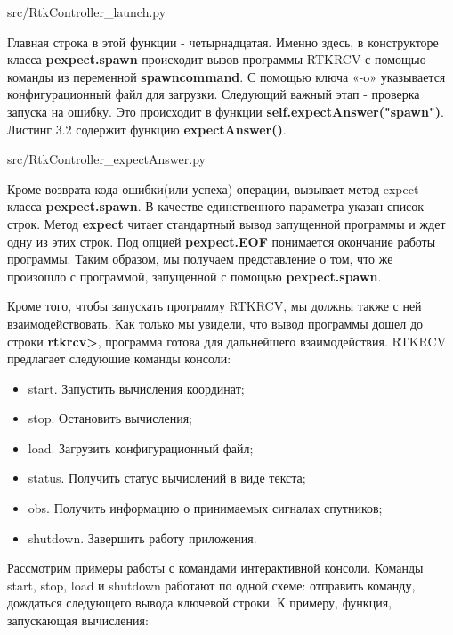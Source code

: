
{src/RtkController_launch.py}

Главная строка в этой функции - четырнадцатая. Именно здесь, в конструкторе класса \textbf{pexpect.spawn} происходит вызов программы RTKRCV с помощью команды из переменной \textbf{spawn\textunderscore command}. С помощью ключа «-o» указывается конфигурационный файл для загрузки. Следующий важный этап - проверка запуска на ошибку. Это происходит в функции \textbf{self.expectAnswer("spawn")}. Листинг 3.2 содержит функцию \textbf{expectAnswer()}.


{src/RtkController_expectAnswer.py}

Кроме возврата кода ошибки(или успеха) операции, вызывает метод expect класса \textbf{pexpect.spawn}. В качестве единственного параметра указан список строк. Метод \textbf{expect} читает стандартный вывод запущенной программы и ждет одну из этих строк. Под опцией \textbf{pexpect.EOF} понимается окончание работы программы. Таким образом, мы получаем представление о том, что же произошло с программой, запущенной с помощью \textbf{pexpect.spawn}.

Кроме того, чтобы запускать программу RTKRCV, мы должны также с ней взаимодействовать. Как только мы увидели, что вывод программы дошел до строки \textbf{rtkrcv>}, программа готова для дальнейшего взаимодействия. RTKRCV предлагает следующие команды консоли:

\begin{itemize}
  \item start. Запустить вычисления координат;
  \item stop. Остановить вычисления;
  \item load. Загрузить конфигурационный файл;
  \item status. Получить статус вычислений в виде текста;
  \item obs. Получить информацию о принимаемых сигналах спутников;
  \item shutdown. Завершить работу приложения.
\end{itemize}

Рассмотрим примеры работы с командами интерактивной консоли. Команды start, stop, load и shutdown работают по одной схеме: отправить команду, дождаться следующего вывода ключевой строки. К примеру, функция, запускающая вычисления:

